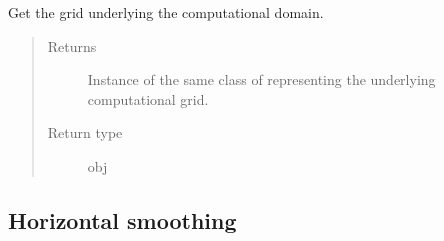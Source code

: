 \documentclass[letterpaper,10pt,english]{sphinxmanual}
\begin{document}
\begin{fulllineitems}
\begin{fulllineitems}
\begin{quote}
\begin{description}
\end{description}\end{quote}

\end{fulllineitems}


\begin{fulllineitems}
\label{\detokenize{api:dycore.horizontal_boundary_relaxed.RelaxedSymmetricYZ.get_computational_grid}}
Get the  grid underlying the computational domain.
\begin{quote}\begin{description}
\item[{Returns}] \leavevmode
Instance of the same class of 
representing the underlying computational grid.

\item[{Return type}] \leavevmode
obj

\end{description}\end{quote}

\end{fulllineitems}


\end{fulllineitems}



\subsection{Horizontal smoothing}
\label{\detokenize{api:horizontal-smoothing}}
\end{document}

